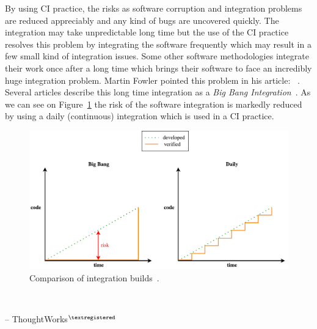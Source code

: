 By using CI practice, the risks as software corruption and integration problems are reduced appreciably and any kind of bugs are uncovered quickly. The integration may take unpredictable long time but the use of the CI practice resolves this problem by integrating the software frequently which may result in a few small kind of integration issues. Some other software methodologies integrate their work once after a long time which brings their software to face an incredibly huge integration problem. Martin Fowler pointed this problem in his article: ~\cite{MartinFowler}. Several articles describe this long time integration as a \textit{Big Bang Integration}~\cite{AaltoUniversity}. As we can see on Figure~\ref{fig:integration} the risk of the software integration is markedly reduced by using a daily (continuous) integration which is used in a CI practice.

\begin{figure}[H]
    \centering
    \includegraphics[scale=0.5]{img/big_bang_vs_daily_build.pdf}
    \caption{Comparison of integration builds~\cite{AaltoUniversity}.}
    \label{fig:integration}
\end{figure}

\begin{displayquote}
    \textit{}\\[-2em]
    \begin{flushright}
        -- ThoughtWorks$^{\tiny{\textregistered}}$~\cite{ThoughtWorks}
    \end{flushright}
\end{displayquote}

